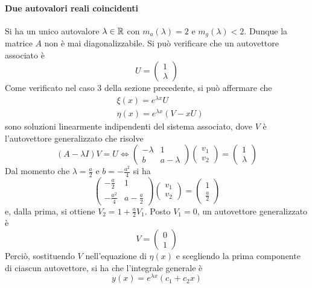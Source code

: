 \paragraph{Due autovalori reali coincidenti}
Si ha un unico autovalore $\lambda \in \mathbb{R}$ con $m_a(\lambda)=2$ e $m_g(\lambda)<2$. Dunque la matrice $A$ non è mai diagonalizzabile. Si può verificare che un autovettore associato è 
\begin{equation}
    U= \begin{pmatrix}
        1\\
        \lambda
    \end{pmatrix}
\end{equation}
Come verificato nel caso 3 della sezione precedente, si può affermare che 
\begin{align}
    &\xi(x)=e^{\lambda
    x}U\\
    &\eta(x)=e^{\lambda x}(V-xU)
\end{align}
sono soluzioni linearmente indipendenti del sistema associato, dove $V$ è l'autovettore generalizzato che risolve 
\begin{equation}
    (A-\lambda I)V=U \iff \begin{pmatrix}
        -\lambda & 1\\
        b & a-\lambda
    \end{pmatrix}
    \begin{pmatrix}
        v_1\\
        v_2
    \end{pmatrix}= \begin{pmatrix}
        1\\
        \lambda
    \end{pmatrix}
\end{equation}
Dal momento che $\lambda= \tfrac{a}{2}$ e $b=-\tfrac{a^2}{4}$ si ha
\begin{equation}
    \begin{pmatrix}
        -\frac{a}{2} & 1\\
        -\frac{a^2}{4} & a-\frac{a}{2}
    \end{pmatrix}
    \begin{pmatrix}
        v_1\\
        v_2
    \end{pmatrix}= \begin{pmatrix}
        1\\
        \frac{a}{2}
        \end{pmatrix}
\end{equation}
e, dalla prima, si ottiene $V_2=1+\tfrac{a}{2}V_1$. Posto $V_1=0$, un autovettore generalizzato è
\begin{equation}
    V=\begin{pmatrix}
        0\\
        1
    \end{pmatrix}
\end{equation}
Perciò, sostituendo $V$ nell'equazione di $\eta(x)$ e scegliendo la prima componente di ciascun autovettore, si ha che l'integrale generale è
\begin{equation}
y(x)= e^{\lambda x}(c_1+c_2 x)    
\end{equation}
